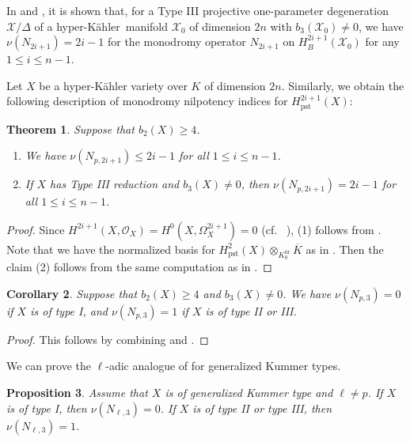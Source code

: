 \documentclass[12pt,reqno]{amsart}
\newtheorem{thm}{Theorem}[section]
\newtheorem{cor}[thm]{Corollary}
\newtheorem{prop}[thm]{Proposition}
\theoremstyle{definition}
\newcommand{\hk}{hyper-Kähler~}
\newcommand{\cO}{\mathcal{O}}
\newcommand{\cX}{\mathcal{X}}
\DeclareMathOperator{\pst}{pst}
\DeclareMathOperator{\ur}{ur}
\numberwithin{equation}{section}
\begin{document}
In \cite[Proposition 3.15]{Soldatenkov20a} and \cite[Proposition 3.12]{HuybrechtsMauri22}, it is shown that, for a Type III projective one-parameter degeneration $\cX/\Delta$ of a \hk manifold $\cX_0$ of dimension $2n$ with $b_3(\cX_0) \neq 0$, we have $\nu(N_{2i+1}) = 2i-1$ for the monodromy operator $N_{2i+1}$ on  $H^{2i+1}_B(\cX_0)$ for any $1 \leq i \leq n-1$.


Let $X$ be a hyper-Kähler variety over $K$ of dimension $2n$.
Similarly, we obtain the following description of monodromy nilpotency indices for
$H^{2i+1}_{\pst}(X)$:

\begin{thm}\label{prop:type III odd cohomolgoy}
Suppose that $b_2(X) \geq 4$.
\begin{enumerate}
    \item We have $\nu(N_{p,2i+1}) \leq 2i-1$
for all $1 \leq i \leq n-1$.
    \item If $X$ has Type III reduction and $b_3(X) \neq 0$, then $\nu(N_{p,2i+1}) = 2i-1$
for all $1 \leq i \leq n-1$.
\end{enumerate}
\end{thm}
\begin{proof}
    Since 
    $H^{2i+1}(X,\cO_{X})=H^0(X,\Omega^{2i+1}_{X})=0$ (cf.~ \cite[Proposition 3]{Beauville83}),
    (1) follows from .
    Note that we have the normalized basis for $H^2_{\pst}(X)\otimes_{K^{\ur}_0} \overline{K}$ as in .
    Then the claim (2) follows from the same computation as in \cite[Proposition 3.15]{Soldatenkov20a}.
\end{proof}

\begin{cor}\label{cor:nilpotency of H^3 p-adic}
    Suppose that $b_2(X) \geq 4$ and $b_3(X) \neq 0$.
    We have
    $\nu(N_{p, 3})=0$ if $X$ is of type I, and $\nu(N_{p, 3})=1$ if $X$ is of type II or III.
\end{cor}

\begin{proof}
    This follows by combining  and .
\end{proof}


We can prove the $\ell$-adic analogue of  for generalized Kummer types.

\begin{prop}\label{prop:nilpotency of H^3 of generalized Kummer}
Assume that $X$ is of generalized Kummer type
and $\ell \neq p$. 
    If $X$ is of type I, then $\nu(N_{\ell, 3})=0$.
    If $X$ is of type II or type III, then $\nu(N_{\ell, 3})=1$.
\end{prop}
\end{document}

